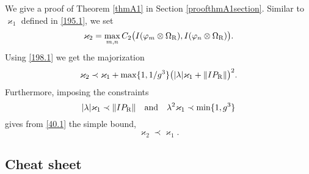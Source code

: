 \documentclass[letterpaper,onecolumn,11pt,accepted=2021-12-09]{quantumarticle}
\numberwithin{equation}{section}
\renewcommand{\r}{{\rm R}}
\begin{document}
We give a proof of Theorem \ref{thmA1} in Section \ref{proofthmA1section}. Similar to $\varkappa_1$ defined in \eqref{195.1}, we set
\begin{equation}
\varkappa_2 = \max_{m,n} C_2\big(I(\varphi_m\otimes\Omega_\r), I(\varphi_n\otimes\Omega_\r)\big).
\label{39.1}
\end{equation}
Using \eqref{198.1} we get the majorization 
\begin{equation}
\varkappa_2 \prec \varkappa_1 +\max\{1,1/g^3\}\big( |\lambda| \varkappa_1 +\|IP_\r\| \big)^2.
\label{40.1}
\end{equation}
Furthermore, imposing the constraints
\begin{equation} 
|\lambda|\varkappa_1\prec \|IP_\r\|\quad\mbox{and}\quad \lambda^2\varkappa_1\prec \min\{1, g^3\}
\label{constraints}
\end{equation}
gives from \eqref{40.1} the simple bound,
\begin{equation}
\varkappa_2\prec \varkappa_1.
\label{kappa12}
\end{equation}




\subsection{Cheat sheet}
\label{cheatsheetsect}
\end{document}
